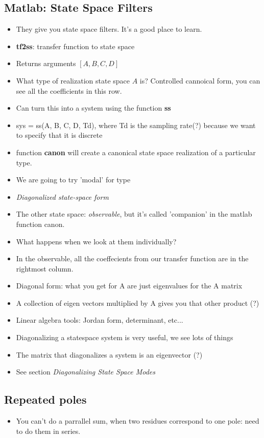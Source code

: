 \subsection*{Matlab: State Space Filters}
\begin{itemize}
\item{They give you state space filters. It's a good place to learn.}
\item{\textbf{tf2ss}: transfer function to state space}
\item{Returns arguments $[A, B, C, D]$}
\item{What type of realization state space $A$ is? Controlled cannoical form, you can see all the coefficients in this row.}
\item{Can turn this into a system using the function \textbf{ss}}
\item{sys = ss(A, B, C, D, Td), where Td is the sampling rate(?) because we want to specify 
that it is discrete}
\item{function \textbf{canon} will create a canonical state space 
realization of a particular type.}
\item{We are going to try 'modal' for type}
\item{\textit{Diagonalized state-space form}}
\item{The other state space: \textit{observable}, but it's called 'companion' in the matlab function canon.}
\item{What happens when we look at them individually?}
\item{In the observable, all the coeffecients from our transfer function are in the rightmost column.}
\item{Diagonal form: what you get for A are just eigenvalues for the A matrix}
\item{A collection of eigen vectors multiplied by A gives you that other product (?)}
\item{Linear algebra tools: Jordan form, determinant, etc...}
\item{Diagonalizing a statespace system is very useful, we see lots of things}
\item{The matrix that diagonalizes a system is an eigenvector (?)}
\item{See section \textit{Diagonalizing State Space Modes}}
\end{itemize}
\subsection*{Repeated poles}
\begin{itemize}
\item{You can't do a parrallel sum, when two residues correspond to one pole: need to do 
them in series.}
\end{itemize}
